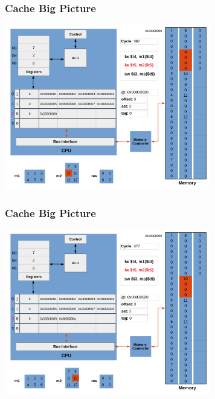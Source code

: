 \documentclass{beamer}
\begin{document}
\begin{frame}[fragile]
\frametitle{Cache Big Picture}

\begin{center}
\vspace*{-0.23cm}
\hspace*{-1cm}\includegraphics[width=9cm]{cache23.pdf}
\end{center}

\end{frame}

\begin{frame}[fragile]
\frametitle{Cache Big Picture}

\begin{center}
\vspace*{-0.23cm}
\hspace*{-1cm}\includegraphics[width=9cm]{cache24.pdf}
\end{center}

\end{frame}
\end{document}
